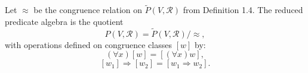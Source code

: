 Let $\approx$ be the congruence relation on $\tilde{P}(V, \mathcal{R})$ from Definition 1.4. The reduced predicate algebra is the quotient
$$P(V, \mathcal{R}) = \tilde{P}(V, \mathcal{R}) / {\approx},$$
with operations defined on congruence classes $[w]$ by:
$$(\forall x)[w] = [(\forall x)w],$$
$$[w_1] \Rightarrow [w_2] = [w_1 \Rightarrow w_2].$$
